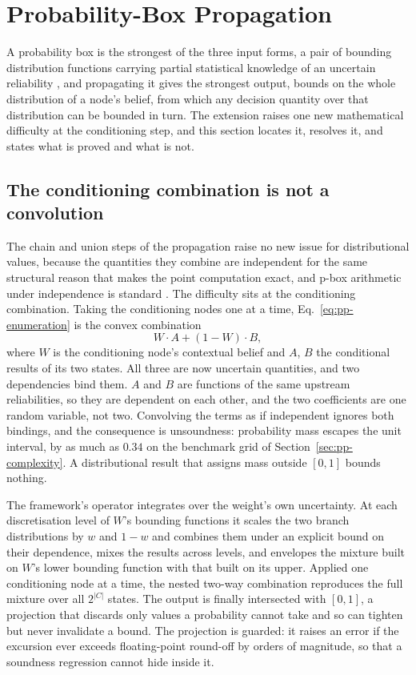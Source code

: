 \documentclass[12pt]{report}
\begin{document}
\section{Probability-Box Propagation}
\label{sec:pp-pbox}

A probability box is the strongest of the three input forms, a pair of bounding distribution functions carrying partial statistical knowledge of an uncertain reliability \cite{ferson2003constructing}, and propagating it gives the strongest output, bounds on the whole distribution of a node's belief, from which any decision quantity over that distribution can be bounded in turn. The extension raises one new mathematical difficulty at the conditioning step, and this section locates it, resolves it, and states what is proved and what is not.

\subsection{The conditioning combination is not a convolution}
\label{sec:pp-pbox-operator}

The chain and union steps of the propagation raise no new issue for distributional values, because the quantities they combine are independent for the same structural reason that makes the point computation exact, and p-box arithmetic under independence is standard \cite{williamson1990probabilistic}. The difficulty sits at the conditioning combination. Taking the conditioning nodes one at a time, Eq.~\eqref{eq:pp-enumeration} is the convex combination
\[
W \cdot A + (1 - W) \cdot B ,
\]
where $W$ is the conditioning node's contextual belief and $A$, $B$ the conditional results of its two states. All three are now uncertain quantities, and two dependencies bind them. $A$ and $B$ are functions of the same upstream reliabilities, so they are dependent on each other, and the two coefficients are one random variable, not two. Convolving the terms as if independent ignores both bindings, and the consequence is unsoundness: probability mass escapes the unit interval, by as much as $0.34$ on the benchmark grid of Section~\ref{sec:pp-complexity}. A distributional result that assigns mass outside $[0,1]$ bounds nothing.

The framework's operator integrates over the weight's own uncertainty. At each discretisation level of $W$'s bounding functions it scales the two branch distributions by $w$ and $1 - w$ and combines them under an explicit bound on their dependence, mixes the results across levels, and envelopes the mixture built on $W$'s lower bounding function with that built on its upper. Applied one conditioning node at a time, the nested two-way combination reproduces the full mixture over all $2^{|C|}$ states. The output is finally intersected with $[0, 1]$, a projection that discards only values a probability cannot take and so can tighten but never invalidate a bound. The projection is guarded: it raises an error if the excursion ever exceeds floating-point round-off by orders of magnitude, so that a soundness regression cannot hide inside it.
\end{document}
